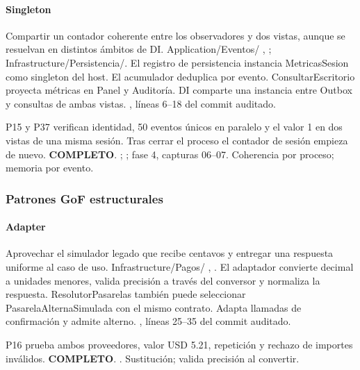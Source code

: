 \paragraph{Singleton}
 Compartir un contador coherente entre los observadores y dos vistas, aunque se resuelvan en distintos ámbitos de DI.
 Application/Eventos/ , ; Infrastructure/Persistencia/. El registro de persistencia instancia MetricasSesion como singleton del host. El acumulador deduplica por evento. ConsultarEscritorio proyecta métricas en Panel y Auditoría.
 DI comparte una instancia entre Outbox y consultas de ambas vistas.
 , líneas 6--18 del commit auditado.

 P15 y P37 verifican identidad, 50 eventos únicos en paralelo y el valor 1 en dos vistas de una misma sesión. Tras cerrar el proceso el contador de sesión empieza de nuevo. \textbf{COMPLETO}.
 ; ; fase 4, capturas 06–07.
 Coherencia por proceso; memoria por evento.
\medskip
\clearpage
\subsubsection{Patrones GoF estructurales}
\paragraph{Adapter}
 Aprovechar el simulador legado que recibe centavos y entregar una respuesta uniforme al caso de uso.
 Infrastructure/Pagos/ , . El adaptador convierte decimal a unidades menores, valida precisión a través del conversor y normaliza la respuesta. ResolutorPasarelas también puede seleccionar PasarelaAlternaSimulada con el mismo contrato.
 Adapta llamadas de confirmación y admite alterno.
 , líneas 25--35 del commit auditado.

 P16 prueba ambos proveedores, valor USD 5.21, repetición y rechazo de importes inválidos. \textbf{COMPLETO}.
 .
 Sustitución; valida precisión al convertir.
\medskip
\clearpage
